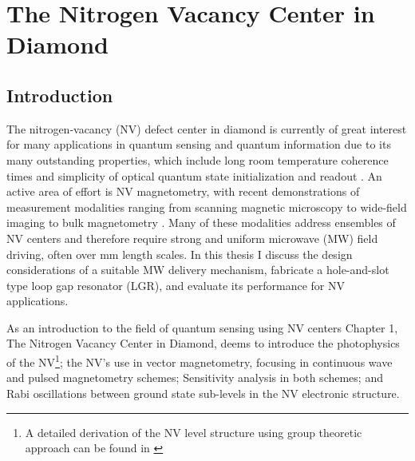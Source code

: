 
\chapter{The Nitrogen Vacancy Center in Diamond}

\section{Introduction}

The nitrogen-vacancy (NV) defect center in diamond is currently of great interest for many applications in quantum sensing \cite{taylor2008high,balasubramanian2008nanoscale,dolde2011electric,neumann2013high, degen2008scanning,hodges2013timekeeping} and quantum information \cite{childress2013diamond,gaebel2006room,dutt2007quantum} due to its many outstanding properties, which include long room temperature coherence times \cite{balasubramanian2008nanoscale} and simplicity of optical quantum state initialization and readout \cite{schirhagl2014nitrogen,jensen2017magnetometry}. An active area of effort is NV magnetometry, with recent demonstrations of measurement modalities ranging from scanning magnetic microscopy \cite{degen2008scanning} to wide-field imaging \cite{pham2011magnetic} to bulk magnetometry \cite{wolf2015subpicotesla}. Many of these modalities address ensembles of NV centers and therefore require strong and uniform microwave (MW) field driving, often over mm length scales. In this thesis I discuss the design considerations of a suitable MW delivery mechanism, fabricate a hole-and-slot type loop gap resonator (LGR), and evaluate its performance for NV applications. 

As an introduction to the field of quantum sensing using NV centers Chapter 1, The Nitrogen Vacancy Center in Diamond, deems to introduce the photophysics of the NV\footnote{A detailed derivation of the NV level structure using group theoretic approach can be found in \cite{doherty2012theory, doherty2013thenitrogen, maze2011properties} }; the NV's use in vector magnetometry, focusing in continuous wave and pulsed magnetometry schemes; Sensitivity analysis in both schemes; and Rabi oscillations between ground state sub-levels in the NV electronic structure.

